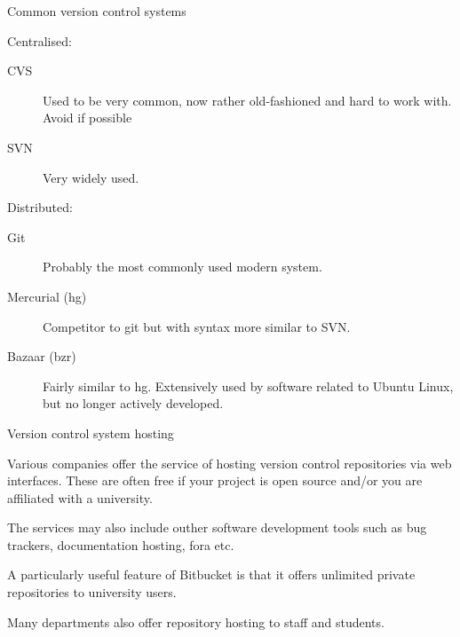 \documentclass[t]{beamer}
\begin{document}
\begin{frame}{Common version control systems}
  
  Centralised:
  \begin{description}
  \item[CVS] Used to be very common, now rather old-fashioned and hard to
    work with. Avoid if possible
  \item[SVN] Very widely used.
  \end{description}

  Distributed:
  \begin{description}
  \item[Git] Probably the most commonly used modern system.
  \item[Mercurial (hg)] Competitor to git but with syntax more similar to SVN.
  \item[Bazaar (bzr)] Fairly similar to hg. Extensively used by software related to Ubuntu Linux,
    but no longer actively developed. 
  \end{description}

\end{frame}

\begin{frame}{Version control system hosting}

  \small
  Various companies offer the service of hosting version control
  repositories via web interfaces. These are often free if your project is
  open source and/or you are affiliated with a university.
  \vspace{1ex}
  
  The services may also include outher software development tools such as
  bug trackers, documentation hosting, fora etc.
  \vspace{1ex}  

  \begin{centering}

  \end{centering}
  \vspace{1ex}  

  A particularly useful feature of Bitbucket is that it offers unlimited
  private repositories to university users.
  \vspace{1ex}  
  
  Many departments also offer repository hosting to staff and students.

\end{frame}
\end{document}
